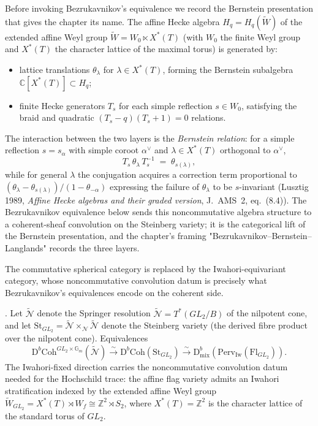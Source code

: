 Before invoking Bezrukavnikov's equivalence we record the Bernstein
presentation that gives the chapter its name. The affine Hecke
algebra \(H_{q}=H_{q}(\widetilde{W})\) of the extended affine Weyl
group \(\widetilde{W}=W_{0}\ltimes X^{*}(T)\) (with \(W_{0}\) the
finite Weyl group and \(X^{*}(T)\) the character lattice of the
maximal torus) is generated by:
\begin{itemize}
\item lattice translations \(\theta_{\lambda}\) for
\(\lambda\in X^{*}(T)\), forming the Bernstein subalgebra
\(\mathbb{C}[X^{*}(T)]\subset H_{q}\);
\item finite Hecke generators \(T_{s}\) for each simple reflection
\(s\in W_{0}\), satisfying the braid and quadratic
\((T_{s}-q)(T_{s}+1)=0\) relations.
\end{itemize}
The interaction between the two layers is the \emph{Bernstein
relation}: for a simple reflection \(s=s_{\alpha}\) with simple
coroot \(\alpha^{\vee}\) and \(\lambda\in X^{*}(T)\) orthogonal to
\(\alpha^{\vee}\),
\[
T_{s}\,\theta_{\lambda}\,T_{s}^{-1}\;=\;\theta_{s(\lambda)},
\]
while for general \(\lambda\) the conjugation acquires a correction
term proportional to \((\theta_{\lambda}-\theta_{s(\lambda)})/(1-\theta_{-\alpha})\)
expressing the failure of \(\theta_{\lambda}\) to be \(s\)-invariant
(Lusztig 1989, \emph{Affine Hecke algebras and their graded version},
J.~AMS~2, eq.~(8.4)). The Bezrukavnikov equivalence below sends this
noncommutative algebra structure to a coherent-sheaf convolution on
the Steinberg variety; it is the categorical lift of the Bernstein
presentation, and the chapter's framing "Bezrukavnikov--Bernstein--Langlands"
records the three layers.

The commutative spherical category is replaced by the Iwahori-equivariant
category, whose noncommutative convolution datum is precisely what Bezrukavnikov's
equivalences encode on the coherent side.

\begin{theorem}
\label{v4-arith:thm:bezrukavnikov}
\ClaimStatusProvedElsewhere. Let \(\widetilde{\mathcal{N}}\) denote the Springer resolution
\(\widetilde{\mathcal{N}}=T^{*}(GL_{2}/B)\) of the nilpotent cone, and let
\(\mathrm{St}_{GL_{2}}=\widetilde{\mathcal{N}}\times_{\mathcal{N}}\widetilde{\mathcal{N}}\)
denote the Steinberg variety (the derived fibre product over the nilpotent cone). Equivalences
\begin{equation*}
\mathrm{D}^{b}\mathrm{Coh}^{GL_{2}\times\mathbb{G}_{m}}(\widetilde{\mathcal{N}})\xrightarrow{\sim}\mathrm{D}^{b}\mathrm{Coh}(\mathrm{St}_{GL_{2}})\xrightarrow{\sim}\mathrm{D}^{b}_{\mathrm{mix}}(\mathrm{Perv}_{\mathrm{Iw}}(\mathrm{Fl}_{GL_{2}})).
\end{equation*}
The Iwahori-fixed direction carries the noncommutative convolution
datum needed for the Hochschild trace: the affine flag
variety admits an Iwahori stratification indexed by the extended affine
Weyl group \(\widetilde{W}_{GL_{2}}=X^{*}(T)\rtimes W_{f}\cong\mathbb{Z}^{2}\rtimes S_{2}\),
where \(X^{*}(T)=\mathbb{Z}^{2}\) is the character lattice of the
standard torus of \(GL_{2}\).
\end{theorem}

